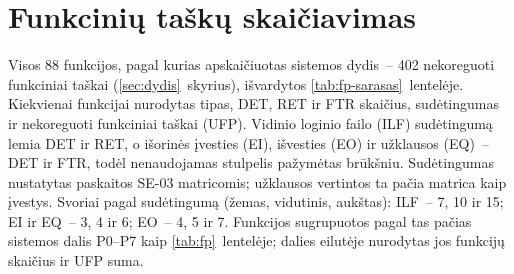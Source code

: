 
\section{Funkcinių taškų skaičiavimas}\label{sec:priedas-fp}

Visos 88 funkcijos, pagal kurias apskaičiuotas sistemos dydis~– 402 nekoreguoti funkciniai taškai
(\ref{sec:dydis}~skyrius), išvardytos \ref{tab:fp-sarasas}~lentelėje. Kiekvienai
funkcijai nurodytas tipas, DET, RET ir FTR skaičius, sudėtingumas ir
nekoreguoti funkciniai taškai (UFP). Vidinio loginio failo (ILF)
sudėtingumą lemia DET ir RET, o išorinės įvesties (EI), išvesties (EO) ir užklausos
(EQ)~– DET ir FTR, todėl nenaudojamas stulpelis pažymėtas brūkšniu.
Sudėtingumas nustatytas paskaitos SE-03 matricomis; užklausos vertintos ta
pačia matrica kaip įvestys. Svoriai pagal sudėtingumą (žemas, vidutinis,
aukštas): ILF~– 7, 10 ir 15; EI ir EQ~– 3, 4 ir 6; EO~– 4, 5 ir 7.
Funkcijos sugrupuotos pagal tas pačias sistemos dalis P0--P7 kaip
\ref{tab:fp}~lentelėje; dalies eilutėje nurodytas jos funkcijų skaičius ir
UFP suma.

